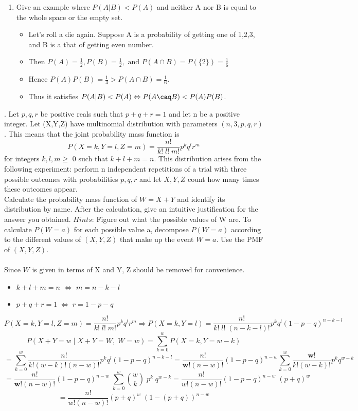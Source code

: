 \documentclass[12pt]{article}
\begin{document}
\begin{enumerate}[label=(\alph*)]
    \item Give an example where $P(A|B) < P(A)$ and neither A nor B is equal to the whole
    space or the empty set.
        \begin{itemize}
            \item Let's roll a die again. Suppose A is a probability of getting one of {1,2,3}, and B is a that of getting even number.
            \item Then $P(A) = \frac{1}{2}, P(B) = \frac{1}{2}, \text{ and } P(A\cap B) = P(\{2\}) = \frac{1}{6}$
            \item Hence $P(A)P(B) = \frac{1}{4} > P(A\cap B) =\frac{1}{6}$.
            \item Thus it satisfies $P(A|B) < P(A) \Leftrightarrow P(A\caq B) < P(A)P(B)$.
        \end{itemize}
\end{enumerate}
\newpage
{}. Let $p, q, r$ be positive reals such that \textbf{$p + q + r = 1$} and let n be a positive integer. Let (X,Y,Z) have multinomial distribution with parameters $(n, 3, p, q, r)$. This means that the joint probability mass function is $$P(X = k, Y = l, Z = m) = \frac{n!}{k!\;l!\;m!} p^kq^lr^m$$ for integers $k, l, m \ge$ 0 such that $k+l+m = n$. This distribution arises from the following
experiment: perform n independent repetitions of a trial with three possible outcomes
with probabilities $p, q, r$ and let $X,Y,Z$ count how many times these outcomes appear.\\

\noindent
Calculate the probability mass function of $W = X + Y$ and identify its distribution by
name. After the calculation, give an intuitive justification for the answer you obtained.
$Hints$: Figure out what the possible values of W are. To calculate $P(W = a)$ for each
possible value a, decompose $P(W = a)$ according to the different values of $(X,Y,Z)$ that
make up the event ${W = a}$. Use the PMF of $(X,Y,Z)$.\\\\

\noindent
Since $W$ is given in terms of X and Y, Z should be removed for convenience.

\begin{itemize}
    \item $k +l + m = n$ $\Leftrightarrow$ $m = n - k - l$
    \item $p + q + r = 1\; \Leftrightarrow \; r = 1 - p - q$
\end{itemize}
$$P(X = k, Y = l, Z = m) = \frac{n!}{k!\;l!\;m!} p^kq^lr^m \Rightarrow P(X = k, Y = l) =\frac{n!}{k!\;l!\;(n-k-l)!}p^kq^l(1-p-q)^{n-k-l}$$
$$P(X+Y=w\;|\;X+Y=W,\;W=w) = \sum_{k=0}^w P(X=k, Y=w-k)$$ 
$$= \sum_{k=0}^w \frac{n!}{k!(w-k)!(n-w)!}p^kq^l(1-p-q)^{n-k-l}= \frac{n!}{\mathbf{w!}(n-w)!}(1-p-q)^{n-w}\sum_{k=0}^w \frac{\mathbf{w!}}{k!(w-k)!}p^kq^{w-k}$$
$$=\frac{n!}{\mathbf{w!}(n-w)!}(1-p-q)^{n-w} \;\sum_{k=0}^w \binom wk \;p^k\; q^{w-k} = \frac{n!}{w!(n-w)!}(1-p-q)^{n-w}\; (p + q)^w $$
$$=\frac{n!}{w!(n-w)!} (p + q)^w \; (1-(p+q))^{n-w} $$\\
\end{document}
